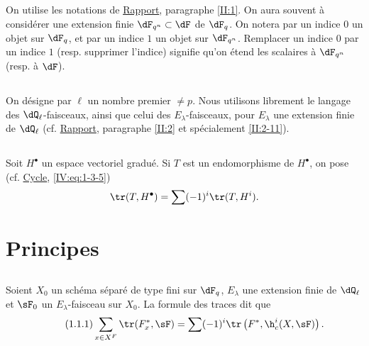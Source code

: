 \subsection{}\label{VI:0-1}

On utilise les notations de \hyperref[II]{Rapport}, paragraphe \ref{II:1}. On 
aura souvent à considérer une extension finie $\dF_{q^n}\subset \dF$ de 
$\dF_q$. On notera par un indice $0$ un objet sur $\dF_q$, et par un indice $1$ 
un objet sur $\dF_{q^n}$. Remplacer un indice $0$ par un indice $1$ (resp. 
supprimer l'indice) signifie qu'on étend les scalaires à $\dF_{q^n}$ (resp. 
à $\dF$).





\subsection{}\label{VI:0-2}

On désigne par $\ell$ un nombre premier $\ne p$. Nous utilisons librement le 
langage des $\dQ_\ell$-faisceaux, ainsi que celui des $E_\lambda$-faisceaux, 
pour $E_\lambda$ une extension finie de $\dQ_\ell$ (cf. \hyperref[II]{Rapport}, 
paragraphe \ref{II:2} et spécialement \ref{II:2-11}). 





\subsection{}\label{VI:0-3}

Soit $H^\bullet$ un espace vectoriel gradué. Si $T$ est un endomorphisme de 
$H^\bullet$, on pose (cf. \hyperref[IV]{Cycle}, \ref{IV:eq:1-3-5}) 
\[
  \tr(T,H^\bullet) = \sum (-1)^i \tr(T,H^i) \text{.}
\]










\section{Principes}\label{VI:1}





\subsection{}\label{VI:1-1}

Soient $X_0$ un schéma séparé de type fini sur $\dF_q$, $E_\lambda$ une 
extension finie de $\dQ_\ell$ et $\sF_0$ un $E_\lambda$-faisceau sur $X_0$. La 
formule des traces dit que 
\begin{equation*}\tag{1.1.1}\label{VI:eq:1-1-1}
  \sum_{x\in X^F} \tr(F_x^\ast,\sF) = \sum (-1)^i \tr\left(F^\ast,\h_c^i(X,\sF)\right) \text{.}
\end{equation*}

